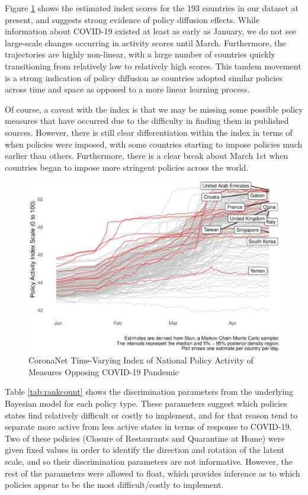 \documentclass[]{article}
\begin{document}
Figure \ref{fig:plotindex} shows the estimated index scores for the 193 countries in our dataset at present, and suggests strong evidence of policy diffusion effects. While information about COVID-19 existed at least as early as January, we do not see large-scale changes occurring in activity scores until March. Furthermore, the trajectories are highly non-linear, with a large number of countries quickly transitioning from relatively low to relatively high scores. This tandem movement is a strong indication of policy diffusion as countries adopted similar policies across time and space as opposed to a more linear learning process.

Of course, a caveat with the index is that we may be missing some possible policy measures that have occurred due to the difficulty in finding them in published sources. However, there is still clear differentiation within the index in terms of when policies were imposed, with some countries starting to impose policies much earlier than others. Furthermore, there is a clear break about March 1st when countries began to impose more stringent policies across the world.

\begin{figure}
\centering
\includegraphics{corona_wp_files/figure-latex/plotindex-1.pdf}
\caption{\label{fig:plotindex}CoronaNet Time-Varying Index of National Policy Activity of Measures Opposing COVID-19 Pandemic}
\end{figure}

Table \ref{tab:rankcount} shows the discrimination parameters from the underlying Bayesian model for each policy type. These parameters suggest which policies states find relatively difficult or costly to implement, and for that reason tend to separate more active from less active states in terms of response to COVID-19. Two of these policies (Closure of Restaurants and Quarantine at Home) were given fixed values in order to identify the direction and rotation of the latent scale, and so their discrimination parameters are not informative. However, the rest of the parameters were allowed to float, which provides inference as to which policies appear to be the most difficult/costly to implement.
\end{document}
